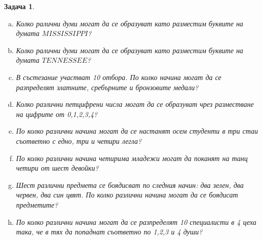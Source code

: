 \documentclass[a4paper]{article}
\newtheorem{problem}{Задача}
\begin{document}
\author{Stefan Vatev}

\begin{problem}
  \begin{enumerate}[a)]
  \item
    Колко ралични думи могат да се образуват като разместим буквите на думата $MISSISSIPPI$?
  \item
    Колко ралични думи могат да се образуват като разместим буквите на думата $TENNESSEE$?
  \item
    В състезание участват 10 отбора. 
    По колко начина могат да се разпределят златните, сребърните и бронзовите медали?
  \item
    Колко различни петцифрени числа могат да се образуват чрез разместване на цифрите от 0,1,2,3,4?
  \item
    По колко различни начина могат да се настанят осем студенти в три стаи съответно с едно, три и четири легла?
  \item
    По колко различни начина четирима младежи могат да поканят на танц четири от шест девойки?
  \item
    Шест различни предмета се боядисват по следния начин: два зелен, два червен, два син цвят.
    По колко различни начина могат да се боядисат предметите?  
  \item
    По колко различни начина могат да се разпределят 10 специалисти в 4 цеха така, че в тях да попаднат съответно по 1,2,3 и 4 души?
  \end{enumerate}
\end{problem}
\end{document}
